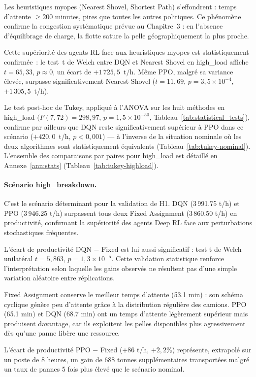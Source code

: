 \documentclass[11pt,a4paper]{report}
\begin{document}
Les heuristiques myopes (Nearest Shovel, Shortest Path) s'effondrent : temps d'attente $\geq 200$ minutes, pires que toutes les autres politiques. Ce phénomène confirme la congestion systématique prévue au Chapitre~3 : en l'absence d'équilibrage de charge, la flotte sature la pelle géographiquement la plus proche.

Cette supériorité des agents RL face aux heuristiques myopes est
statistiquement confirmée~: le test~t de Welch entre DQN et Nearest
Shovel en high\_load affiche $t = 65{,}33$, $p \approx 0$, un écart
de $+1\,725{,}5$~t/h. Même PPO, malgré sa variance élevée, surpasse
significativement Nearest Shovel ($t = 11{,}69$, $p = 3{,}5 \times 10^{-4}$,
$+1\,305{,}5$~t/h).

Le test post-hoc de Tukey, appliqué à l'ANOVA sur les huit méthodes en
high\_load ($F(7,72) = 298{,}97$, $p = 1{,}5 \times 10^{-50}$, Tableau~\ref{tab:statistical_tests}),
confirme par ailleurs que DQN reste significativement supérieur à PPO
dans ce scénario ($+420{,}0$~t/h, $p < 0{,}001$) --- à l'inverse de la
situation nominale où les deux algorithmes sont statistiquement
équivalents (Tableau~\ref{tab:tukey-nominal}). L'ensemble des
comparaisons par paires pour high\_load est détaillé en
Annexe~\ref{ann:stats} (Tableau~\ref{tab:tukey-highload}).

\paragraph{Scénario high\_breakdown.}
C'est le scénario déterminant pour la validation de H1. DQN (3\,991.75 t/h) et PPO (3\,946.25 t/h) surpassent tous deux Fixed Assignment (3\,860.50 t/h) en productivité, confirmant la supériorité des agents Deep RL face aux perturbations stochastiques fréquentes.

L'écart de productivité DQN $-$ Fixed est lui aussi significatif : test t de Welch unilatéral $t = 5{,}863$, $p = 1{,}3 \times 10^{-5}$. Cette validation statistique renforce l'interprétation selon laquelle les gains observés ne résultent pas d'une simple variation aléatoire entre réplications.

Fixed Assignment conserve le meilleur temps d'attente (53.1 min) : son schéma cyclique génère peu d'attente grâce à la distribution régulière des camions. PPO (65.1 min) et DQN (68.7 min) ont un temps d'attente légèrement supérieur mais produisent davantage, car ils exploitent les pelles disponibles plus agressivement dès qu'une panne libère une ressource.

L'écart de productivité PPO $-$ Fixed (+86 t/h, $+2{,}2\%$) représente, extrapolé sur un poste de 8 heures, un gain de 688 tonnes supplémentaires transportées malgré un taux de pannes 5 fois plus élevé que le scénario nominal.
\end{document}
